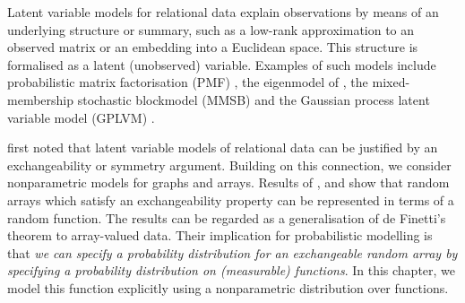 Latent variable models for relational data explain observations by means of an underlying structure
or summary,
such as a low-rank approximation to an observed matrix or an embedding into a Euclidean space.
This structure is formalised as a latent (unobserved) variable.
Examples of such models include probabilistic matrix factorisation (PMF) \citep{Salakhutdinov2008-tp}, the eigenmodel of 
\citet{Hoff2007-ja}, the mixed-membership stochastic blockmodel (MMSB) \citep{Airoldi2008-fr}
and the Gaussian process latent variable model (GPLVM) \citep[e.g.][]{Lawrence2009-za}.

\citet{Hoff2007-ja} first noted that latent variable models of relational data can be justified by an exchangeability or symmetry argument.
Building on this connection, we consider nonparametric models for graphs and arrays.
Results of \citet{Aldous1981-lg}, \citet{Hoover1979-br} and \citet{Kallenberg1992-gb} show that random arrays which satisfy an exchangeability property can be represented in terms of a random function.
The results can be regarded as a generalisation of de Finetti's theorem to array-valued data.
Their implication for probabilistic modelling is that
\emph{we can specify a probability distribution for an exchangeable random array by specifying a probability distribution on (measurable) functions}.
In this chapter, we model this function explicitly using a nonparametric distribution over functions.


%    

